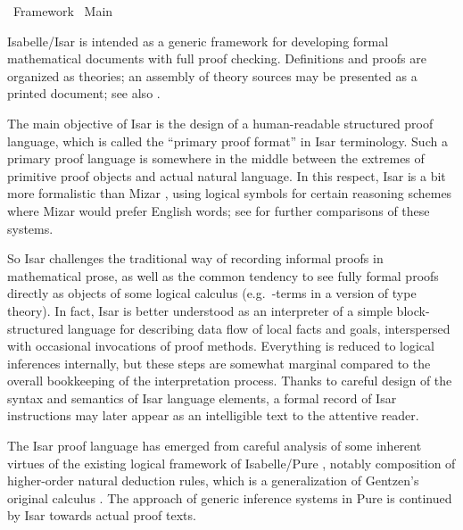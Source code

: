 %
\begin{isabellebody}%
\def\isabellecontext{Framework}%
%
\isadelimtheory
%
\endisadelimtheory
%
\isatagtheory
{}\isamarkupfalse%
\ Framework\isanewline
{}\ Main\isanewline
{}%
\endisatagtheory
{\isafoldtheory}%
%
\isadelimtheory
%
\endisadelimtheory
%
\isamarkuptrue%
%
\begin{isamarkuptext}%
Isabelle/Isar
  \cite{Wenzel:1999:TPHOL,Wenzel-PhD,Nipkow-TYPES02,Wenzel-Paulson:2006,Wenzel:2006:Festschrift}
  is intended as a generic framework for developing formal
  mathematical documents with full proof checking.  Definitions and
  proofs are organized as theories; an assembly of theory sources may
  be presented as a printed document; see also
  .

  The main objective of Isar is the design of a human-readable
  structured proof language, which is called the ``primary proof
  format'' in Isar terminology.  Such a primary proof language is
  somewhere in the middle between the extremes of primitive proof
  objects and actual natural language.  In this respect, Isar is a bit
  more formalistic than Mizar
  \cite{Trybulec:1993:MizarFeatures,Rudnicki:1992:MizarOverview,Wiedijk:1999:Mizar},
  using logical symbols for certain reasoning schemes where Mizar
  would prefer English words; see \cite{Wenzel-Wiedijk:2002} for
  further comparisons of these systems.

  So Isar challenges the traditional way of recording informal proofs
  in mathematical prose, as well as the common tendency to see fully
  formal proofs directly as objects of some logical calculus (e.g.\
  \isa{{\isachardoublequote}{\isasymlambda}{\isachardoublequote}}-terms in a version of type theory).  In fact, Isar is
  better understood as an interpreter of a simple block-structured
  language for describing data flow of local facts and goals,
  interspersed with occasional invocations of proof methods.
  Everything is reduced to logical inferences internally, but these
  steps are somewhat marginal compared to the overall bookkeeping of
  the interpretation process.  Thanks to careful design of the syntax
  and semantics of Isar language elements, a formal record of Isar
  instructions may later appear as an intelligible text to the
  attentive reader.

  The Isar proof language has emerged from careful analysis of some
  inherent virtues of the existing logical framework of Isabelle/Pure
  \cite{paulson-found,paulson700}, notably composition of higher-order
  natural deduction rules, which is a generalization of Gentzen's
  original calculus \cite{Gentzen:1935}.  The approach of generic
  inference systems in Pure is continued by Isar towards actual proof
  texts.


\end{isamarkuptext}
\end{isabellebody}
